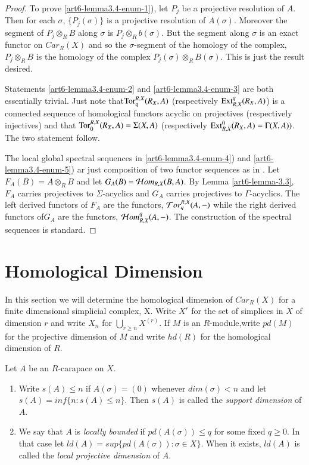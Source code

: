 \begin{proof}
To prove \ref{art6-lemma3.4-enum-1}), let ${P_{j}}$ be a projective resolution of $A$. Then for each $\sigma$, $\{P_{j}(\sigma)\}$ is a projective resolution of $A(\sigma)$. Moreover the segment of $P_{j}\otimes_{R}B$ along $\sigma$ is $P_{j}\otimes_{R}b(\sigma)$. But the segment along $\sigma$ is an exact functor on $C ar_{R}(X)$ and so the $\sigma$-segment of the homology of the complex, $P_{j}\otimes_{R}B$ is the homology of the complex $P_{j}(\sigma) \otimes_{R}B(\sigma)$. This is just the result desired.

Statements \ref{art6-lemma3.4-enum-2} and \ref{art6-lemma3.4-enum-3} are both essentially trivial. Just note that\break $\operatorname{Tor}_{q}^{R, X}(R_{X}, A)$ (respectively $\operatorname{Ext}_{R,X}^{q}(R_{X}, A)$) is a connected sequence of homological functors acyclic on projectives (respectively injectives) and that $\operatorname{Tor}_{0}^{R,X}(R_{X},A)=\Sigma(X, A)$ (respectively $\operatorname{Ext}_{R,X}^{0}(R_{X},A) = \Gamma(X,A))$. The two statement follow.

The local global spectral sequences in \ref{art6-lemma3.4-enum-4}) and \ref{art6-lemma3.4-enum-5}) ar just composition of two functor sequences as in \cite{art6-keyGr}. Let $F_{A}(B) = A\otimes_{R}B$ and let $G_{A}(B) = \mathcal{H} om_{R,X}(B,A)$. By Lemma \ref{art6-lemma-3.3}, $F_{A}$ carries projectives to $\Sigma$-acyclics and $G_{A}$ carries projectives to $\Gamma$-acyclics. The left derived functors of $F_{A}$ are the functors, $\mathcal{T} or_{q}^{R,X}(A,-)$ while the right derived functors of$G_{A}$ are the functors, $\mathcal{H} om_{R,X}^{q}(A, -)$. The construction of the spectral sequences is standard.
\end{proof}

\section{Homological Dimension}\label{art6-sec-4}

In this section we will determine the homological dimension of $C ar_{R}(X)$ for a finite dimensional simplicial complex, X. Write $X^{r}$ for the set of simplices in $X$ of dimension $r$ and write $X_{n}$ for $\bigcup_{r\geq n}X^{(r)}$. If $M$ is an $R$-module,write $pd(M)$ for the projective dimension of $M$ and write $hd(R)$ for the homological dimension of $R$. 

\begin{definition}\label{art6-defin-4.1}
Let $A$ be an $R$-carapace on $X$.
    \begin{enumerate}[(1)]
    \item Write $s(A)\leq n$ if $A(\sigma) = (0)$ whenever $dim(\sigma) < n$ and let $s(A) = inf\{n: s(A) \leq n\}$. Then $s(A)$ is called the \textit{support dimension} of $A$.\label{art6-defin1-enum-1}
    \item We say that $A$ is \textit{locally bounded} if $pd(A(\sigma)) \leq q$ for some fixed $q \geq 0$. In that case let $ld(A)=sup\{pd(A(\sigma)) : \sigma \in X\}$. When it exists, $ld(A)$ is called the \textit{local projective dimension} of $A$.\label{art6-defin1-enum-2}
    \end{enumerate}
\end{definition}

